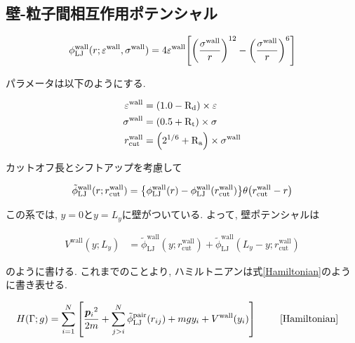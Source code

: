\subsection{壁-粒子間相互作用ポテンシャル}

\begin{align}
  \phi_{\text{LJ}}^{\text{wall}}(r; \varepsilon^{\text{wall}}, \sigma^{\text{wall}}) = 4\varepsilon^{\text{wall}} \qty[\qty(\frac{\sigma^{\text{wall}}}{r})^{12} - \qty(\frac{\sigma^{\text{wall}}}{r})^{6} ] \\
\end{align}

パラメータは以下のようにする.

\begin{align}
  \varepsilon^{\text{wall}} &= \qty(1.0 - \text{R}_\text{d}) \times \varepsilon \\
  \sigma^{\text{wall}} &= \qty(0.5 + \text{R}_\text{t}) \times \sigma \\
  r^{\text{wall}}_{\text{cut}} &= \qty(2^{1/6} + \text{R}_\text{a}) \times \sigma^{\text{wall}}
\end{align}

カットオフ長とシフトアップを考慮して

\begin{align}
  \tilde{\phi}_{\text{LJ}}^{\text{wall}}(r;r_{\text{cut}}^{\text{wall}}) = \qty{\phi_{\text{LJ}}^{\text{wall}}(r) - \phi_{\text{LJ}}^{\text{wall}}(r_{\text{cut}}^{\text{wall}})}\theta \qty(r_{\text{cut}}^{\text{wall}}-r) \\
\end{align}

この系では, $y=0$と$y=L_y$に壁がついている. よって, 壁ポテンシャルは

\begin{align}
  V^{\text{wall}}(y; L_y) &= \tilde{\phi}_{\text{LJ}}^{\text{wall}}(y;r_{\text{cut}}^{\text{wall}}) + \tilde{\phi}_{\text{LJ}}^{\text{wall}}(L_y - y;r_{\text{cut}}^{\text{wall}})
\end{align}

のように書ける. これまでのことより, ハミルトニアンは式\eqref{Hamiltonian}のように書き表せる.

\begin{align}
    H(\Gamma; g)
    &= \sum_{i=1}^{N}
    \left[
      \frac{{\bm{p}_i}^2}{2m} 
      + \sum_{j > i}^{N}
        \tilde{\phi}_{\text{LJ}}^{\text{pair}}(r_{ij})
      + mgy_i +V^{\text{wall}}(y_i)
    \right] \ \tag*{\eqref{Hamiltonian}} 
\end{align}

